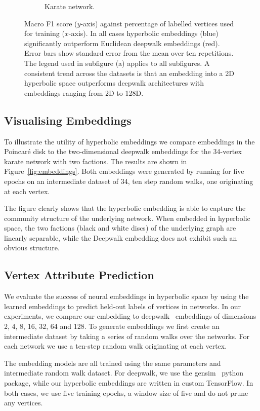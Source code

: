\documentclass[sigconf, review]{acmart}
\begin{document}
\begin{figure}[h!]
\begin{subfigure}[t]{0.4\textwidth}
        \caption{Karate network.}
    \end{subfigure}
    \caption{Macro F1 score ($y$-axis) against percentage of labelled vertices used for training ($x$-axis). In all cases hyperbolic embeddings (blue) significantly outperform Euclidean deepwalk embeddings (red). Error bars show standard error from the mean over ten repetitions. The legend used in subfigure (a) applies to all subfigures. A consistent trend across the datasets is that an embedding into a 2D hyperbolic space outperforms deepwalk architectures with embeddings ranging from 2D to 128D.}
    \label{fig:results}
\end{figure}
\subsection{Visualising Embeddings}
To illustrate the utility of hyperbolic embeddings we compare embeddings in the Poincar\'e disk to the two-dimensional deepwalk embeddings for the 34-vertex karate network with two factions. The results are shown in Figure~\ref{fig:embeddings}. Both embeddings were generated by running for five epochs on an intermediate dataset of 34, ten step random walks, one originating at each vertex.

%
The figure clearly shows that the hyperbolic embedding is able to capture the community structure of the underlying network. When embedded in hyperbolic space, the two factions (black and white discs) of the underlying graph are linearly separable, while the Deepwalk embedding does not exhibit such an obvious structure.

\subsection{Vertex Attribute Prediction}


We evaluate the success of neural embeddings in hyperbolic space by using the learned embeddings to predict held-out labels of vertices in networks. In our experiments, we compare our embedding to deepwalk~\cite{Perozzi2014} embeddings of dimensions 2, 4, 8, 16, 32, 64 and 128. 
To generate embeddings we first create an intermediate dataset by taking a series of random walks over the networks. For each network we use a ten-step random walk originating at each vertex. 

The embedding models are all trained using the same parameters and intermediate random walk dataset. For deepwalk, we use the gensim~\cite{Rehurek2010} python package, while our hyperbolic embeddings are written in custom TensorFlow. In both cases, we use five training epochs, a window size of five and do not prune any vertices.
\end{document}

